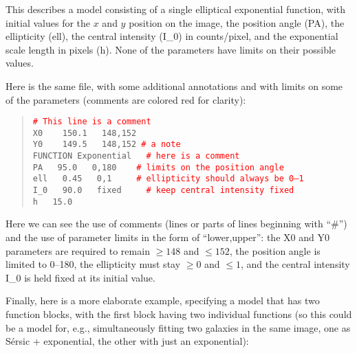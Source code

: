 \documentclass[10pt,a4paper,article]{memoir}
\newcommand{\red}{\textcolor{red}}
\begin{document}
This describes a model consisting of a single elliptical exponential
function, with initial values for the $x$ and $y$ position on the image,
the position angle (PA), the ellipticity (ell), the central intensity
(I\_0) in counts/pixel, and the exponential scale length in pixels (h).
None of the parameters have limits on their possible values.

Here is the same file, with some additional annotations and with limits on
some of the parameters (comments are colored red for clarity):

\begin{quote}
  \texttt{\red{\# This line is a comment}}\\
  
  \texttt{X0 ~~   150.1 ~  148,152}\\
  \texttt{Y0 ~~   149.5 ~  148,152         \red{\# a note}}\\
  \texttt{FUNCTION   Exponential  ~ \red{\# here is a comment}}\\
  \texttt{PA  ~  95.0  ~ 0,180   ~~   \red{\# limits on the position angle}}\\
  \texttt{ell  ~  0.45 ~ 0,1     ~~~ \red{\# ellipticity should always be 0--1}}\\
  \texttt{I\_0 ~  90.0 ~  fixed ~~~ \red{\# keep central intensity fixed}}\\
  \texttt{h    ~ 15.0}\\
\end{quote}

Here we can see the use of comments (lines or parts of lines beginning with
``\#'') and the use of parameter limits in the form of ``lower,upper'': the X0
and Y0 parameters are required to remain $\geq 148$ and $\leq 152$, the position
angle is limited to 0--180, the ellipticity must stay $\geq 0$ and $\leq 1$, and
the central intensity I\_0 is held fixed at its initial value.

Finally, here is a more elaborate example, specifying a model that has two
function blocks, with the first block having two individual functions (so this
could be a model for, e.g., simultaneously fitting two galaxies in the same
image, one as S\'ersic + exponential, the other with just an exponential):
\end{document}
